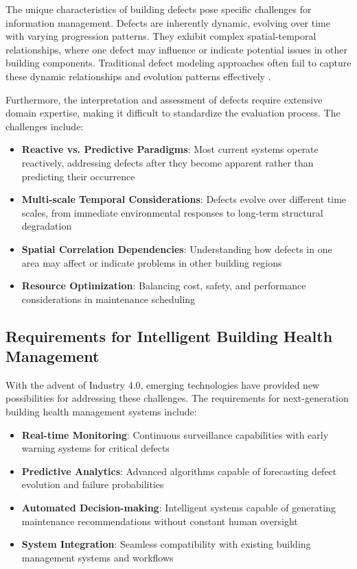 The unique characteristics of building defects pose specific challenges for information management. Defects are inherently dynamic, evolving over time with varying progression patterns. They exhibit complex spatial-temporal relationships, where one defect may influence or indicate potential issues in other building components. Traditional defect modeling approaches often fail to capture these dynamic relationships and evolution patterns effectively \cite{wang2023augmented}.

Furthermore, the interpretation and assessment of defects require extensive domain expertise, making it difficult to standardize the evaluation process. The challenges include:

\begin{itemize}
    \item \textbf{Reactive vs. Predictive Paradigms}: Most current systems operate reactively, addressing defects after they become apparent rather than predicting their occurrence
    \item \textbf{Multi-scale Temporal Considerations}: Defects evolve over different time scales, from immediate environmental responses to long-term structural degradation
    \item \textbf{Spatial Correlation Dependencies}: Understanding how defects in one area may affect or indicate problems in other building regions
    \item \textbf{Resource Optimization}: Balancing cost, safety, and performance considerations in maintenance scheduling
\end{itemize}

\subsection{Requirements for Intelligent Building Health Management}

With the advent of Industry 4.0, emerging technologies have provided new possibilities for addressing these challenges. The requirements for next-generation building health management systems include:

\begin{itemize}
    \item \textbf{Real-time Monitoring}: Continuous surveillance capabilities with early warning systems for critical defects
    \item \textbf{Predictive Analytics}: Advanced algorithms capable of forecasting defect evolution and failure probabilities
    \item \textbf{Automated Decision-making}: Intelligent systems capable of generating maintenance recommendations without constant human oversight
    \item \textbf{System Integration}: Seamless compatibility with existing building management systems and workflows
\end{itemize}

